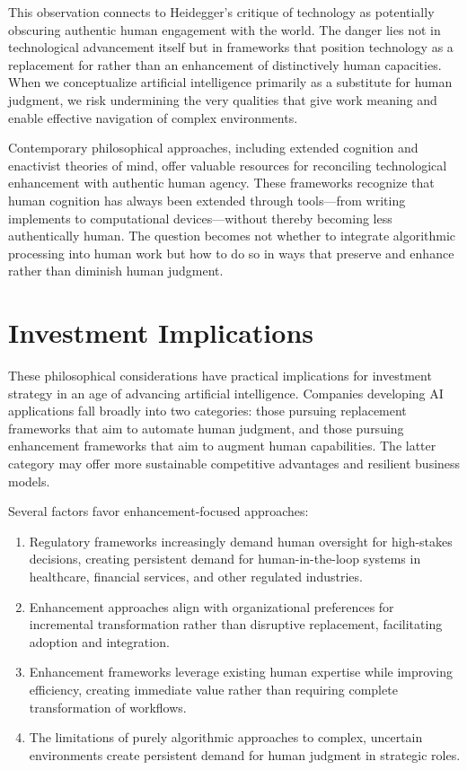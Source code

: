 \documentclass[
  Letterpaper,
]{scrbook}
\begin{document}
This observation connects to Heidegger's critique of technology as
potentially obscuring authentic human engagement with the world. The
danger lies not in technological advancement itself but in frameworks
that position technology as a replacement for rather than an enhancement
of distinctively human capacities. When we conceptualize artificial
intelligence primarily as a substitute for human judgment, we risk
undermining the very qualities that give work meaning and enable
effective navigation of complex environments.

Contemporary philosophical approaches, including extended cognition and
enactivist theories of mind, offer valuable resources for reconciling
technological enhancement with authentic human agency. These frameworks
recognize that human cognition has always been extended through
tools---from writing implements to computational devices---without
thereby becoming less authentically human. The question becomes not
whether to integrate algorithmic processing into human work but how to
do so in ways that preserve and enhance rather than diminish human
judgment.

\section{Investment Implications}\label{investment-implications-2}

These philosophical considerations have practical implications for
investment strategy in an age of advancing artificial intelligence.
Companies developing AI applications fall broadly into two categories:
those pursuing replacement frameworks that aim to automate human
judgment, and those pursuing enhancement frameworks that aim to augment
human capabilities. The latter category may offer more sustainable
competitive advantages and resilient business models.

Several factors favor enhancement-focused approaches:

\begin{enumerate}
\def\labelenumi{\arabic{enumi}.}
\item
  Regulatory frameworks increasingly demand human oversight for
  high-stakes decisions, creating persistent demand for
  human-in-the-loop systems in healthcare, financial services, and other
  regulated industries.
\item
  Enhancement approaches align with organizational preferences for
  incremental transformation rather than disruptive replacement,
  facilitating adoption and integration.
\item
  Enhancement frameworks leverage existing human expertise while
  improving efficiency, creating immediate value rather than requiring
  complete transformation of workflows.
\item
  The limitations of purely algorithmic approaches to complex, uncertain
  environments create persistent demand for human judgment in strategic
  roles.
\end{enumerate}
\end{document}

